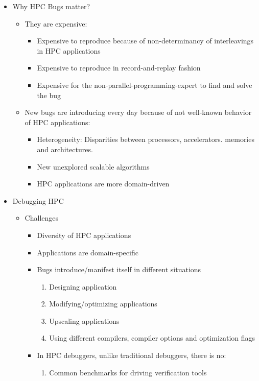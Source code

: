 
\begin{itemize}
\item Why HPC Bugs matter?\\
	\begin{itemize}
	\item They are expensive:
		\begin{itemize}
		\item Expensive to reproduce because of non-determinancy of interleavings in HPC applications
		\item Expensive to reproduce in record-and-replay fashion
		\item Expensive for the non-parallel-programming-expert to find and solve the bug 
		\end{itemize}
	\item New bugs are introducing every day because of not well-known behavior of HPC applications:
		\begin{itemize}
		\item Heterogeneity: Disparities between processors, accelerators. memories and architectures.
		\item New unexplored scalable algorithms
		\item HPC applications are more domain-driven
		\end{itemize}
	\end{itemize}
\item Debugging HPC
	\begin{itemize}
	\item Challenges
		\begin{itemize}
		\item Diversity of HPC applications
		\item Applications are domain-specific 
		\item Bugs introduce/manifest itself in different situations
			\begin{enumerate}
			\item Designing application
			\item Modifying/optimizing applications
			\item Upscaling applications
			\item Using different compilers, compiler options and optimization flags
			\end{enumerate}
		\item In HPC debuggers, unlike traditional debuggers, there is no:
			\begin{enumerate}
			\item  Common benchmarks for driving verification tools

\end{enumerate}
\end{itemize}
\end{itemize}
\end{itemize}
